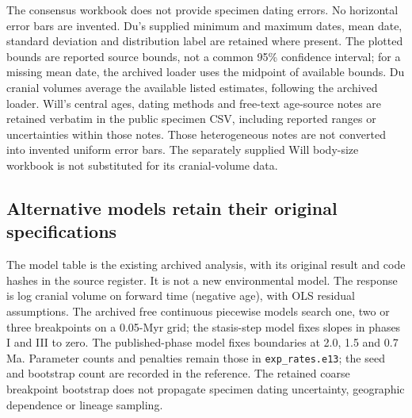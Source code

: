 The consensus workbook does not provide specimen dating errors. No horizontal error bars are invented. Du's supplied minimum and maximum dates, mean date, standard deviation and distribution label are retained where present. The plotted bounds are reported source bounds, not a common 95\% confidence interval; for a missing mean date, the archived loader uses the midpoint of available bounds. Du cranial volumes average the available listed estimates, following the archived loader. Will's central ages, dating methods and free-text age-source notes are retained verbatim in the public specimen CSV, including reported ranges or uncertainties within those notes. Those heterogeneous notes are not converted into invented uniform error bars. The separately supplied Will body-size workbook is not substituted for its cranial-volume data.




\subsection{Alternative models retain their original specifications}

The model table is the existing archived analysis, with its original result and code hashes in the source register. It is not a new environmental model. The response is log cranial volume on forward time (negative age), with OLS residual assumptions. The archived free continuous piecewise models search one, two or three breakpoints on a 0.05-Myr grid; the stasis-step model fixes slopes in phases I and III to zero. The published-phase model fixes boundaries at 2.0, 1.5 and 0.7 Ma. Parameter counts and penalties remain those in \texttt{exp\_rates.e13}; the seed and bootstrap count are recorded in the reference. The retained coarse breakpoint bootstrap does not propagate specimen dating uncertainty, geographic dependence or lineage sampling.

